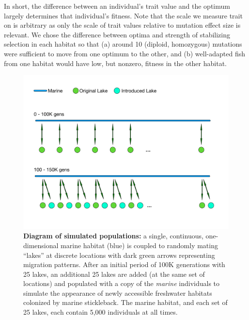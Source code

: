 \documentclass{article}
\begin{document}
In short, the difference between an individual's trait value and the optimum largely determines that individual's fitness. 
Note that the scale we measure trait on is arbitrary as only the scale of trait values relative to mutation effect size is relevant.
We chose the difference between optima and strength of stabilizing selection in each habitat
so that 
(a) around 10 (diploid, homozygous) mutations were sufficient to move from one optimum to the other,
and (b) well-adapted fish from one habitat would have low, but nonzero, fitness in the other habitat.

\begin{figure}
	\begin{center}
  		\includegraphics[width=0.6\linewidth]{GeographyFigure.pdf}
  		\caption{
            \textbf{Diagram of simulated populations:}
            a single, continuous, one-dimensional marine habitat (blue)
            is coupled to randomly mating ``lakes'' at discrete locations with dark green arrows representing migration patterns.
            After an initial period of 100K generations with 25 lakes,
            an additional 25 lakes are added (at the same set of locations) and populated with a copy of the \textit{marine} individuals
            to simulate the appearance of newly accessible freshwater habitats colonized by marine stickleback.
            The marine habitat, and each set of 25 lakes, each contain 5,000 individuals at all times.
			}
  		\label{fig:Geo}
	\end{center}
\end{figure}
\end{document}
